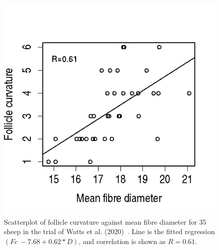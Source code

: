 %

\begin{figure}[]
\centering
    \includegraphics[scale=0.60]{fcd.png}
  \caption{Scatterplot of follicle curvature against mean fibre diameter for 35 sheep in the trial of Watts et al. (2020)~\cite{watts-2020}. Line is the fitted regression $(Fc ~ -7.68 + 0.62 * D)$, and correlation is shown as $R=0.61$.}
\vfill
  \label{fig:fcd}
\end{figure}

%

